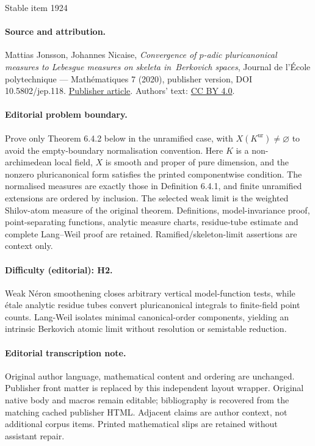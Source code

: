 \documentclass[11pt]{article}
\theoremstyle{definition}
\numberwithin{equation}{subsection}
\begin{document}
\begin{center}{\Large Stable item 1924}\end{center}
\paragraph{Source and attribution.}
Mattias Jonsson, Johannes Nicaise, \emph{Convergence of $p$-adic pluricanonical measures to Lebesgue measures on skeleta in Berkovich spaces}, Journal de l’École polytechnique — Mathématiques 7 (2020), publisher version, DOI 10.5802/jep.118. \href{https://jep.centre-mersenne.org/articles/10.5802/jep.118/}{Publisher article}. Authors' text: \href{https://creativecommons.org/licenses/by/4.0/}{CC BY 4.0}.
\paragraph{Editorial problem boundary.}
Prove only Theorem 6.4.2 below in the unramified case, with \(X(K^{\mathrm{ur}})\ne\varnothing\) to avoid the empty-boundary normalisation convention. Here \(K\) is a non-archimedean local field, \(X\) is smooth and proper of pure dimension, and the nonzero pluricanonical form satisfies the printed componentwise condition. The normalised measures are exactly those in Definition 6.4.1, and finite unramified extensions are ordered by inclusion. The selected weak limit is the weighted Shilov-atom measure of the original theorem. Definitions, model-invariance proof, point-separating functions, analytic measure charts, residue-tube estimate and complete Lang--Weil proof are retained. Ramified/skeleton-limit assertions are context only.
\paragraph{Difficulty (editorial): H2.}
Weak Néron smoothening closes arbitrary vertical model-function tests, while étale analytic residue tubes convert pluricanonical integrals to finite-field point counts. Lang-Weil isolates minimal canonical-order components, yielding an intrinsic Berkovich atomic limit without resolution or semistable reduction.
\paragraph{Editorial transcription note.}
Original author language, mathematical content and ordering are unchanged. Publisher front matter is replaced by this independent layout wrapper. Original native body and macros remain editable; bibliography is recovered from the matching cached publisher HTML. Adjacent claims are author context, not additional corpus items. Printed mathematical slips are retained without assistant repair.
\clearpage
\end{document}
